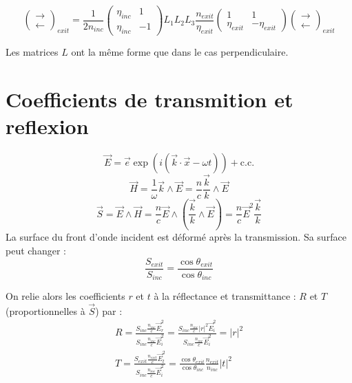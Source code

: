 \documentclass[a4paper,english]{article}
\begin{document}
\begin{dmath}
\begin{pmatrix}\rightarrow \\ \leftarrow\end{pmatrix}_{exit} =
\frac{1}{2 n_{inc}} \begin{pmatrix} \eta_{inc} & 1 \\ \eta_{inc} & -1 \end{pmatrix} L_1 L_2 L_3 \frac{n_{exit}}{\eta_{exit}} \begin{pmatrix} 1 & 1 \\ \eta_{exit} & -\eta_{exit} \end{pmatrix}
\begin{pmatrix}\rightarrow \\ \leftarrow\end{pmatrix}_{exit}
\end{dmath}

Les matrices $L$ ont la même forme que dans le cas perpendiculaire.
















\section{Coefficients de transmition et reflexion}
\begin{dmath}
	\vec E = \vec e \exp(i (\vec k \cdot \vec x - \omega t)) + \text{c.c.}
\end{dmath}
\begin{equation}
	\vec H = \frac{1}{\omega} \vec k \wedge \vec E = \frac{n}{c} \frac{\vec k}{k} \wedge \vec E 
\end{equation}
\begin{equation}
	\vec S = \vec E \wedge \vec H = \frac{n}{c} \vec E \wedge (\frac{\vec k}{k} \wedge \vec E) = \frac{n}{c} \vec E^2 \frac{\vec k}{k}
\end{equation}
La surface du front d'onde incident est déformé après la transmission. Sa surface peut changer :
\begin{equation}
	\frac{S_{exit}}{S_{inc}} = \frac{\cos \theta_{exit}}{\cos \theta_{inc}}
\end{equation}

On relie alors les coefficients $r$ et $t$ à la réflectance et transmittance : $R$ et $T$ (proportionnelles à $\vec S$) par :
\begin{align}
	R = \frac{S_{inc} \frac{n_{inc}}{c} \vec E_{r}^2}{S_{inc} \frac{n_{inc}}{c} \vec E_{i}^2} = \frac{S_{inc}\frac{n_{inc}}{c} |r|^2 \vec E_{i}^2}{S_{inc} \frac{n_{inc}}{c} \vec E_{i}^2} = |r|^2 \\
	T = \frac{S_{exit} \frac{n_{exit}}{c} \vec E_{t}^2}{S_{inc} \frac{n_{inc}}{c} \vec E_{i}^2} = \frac{\cos \theta_{exit}}{\cos \theta_{inc}} \frac{n_{exit}}{n_{inc}} |t|^2
\end{align}
\end{document}
